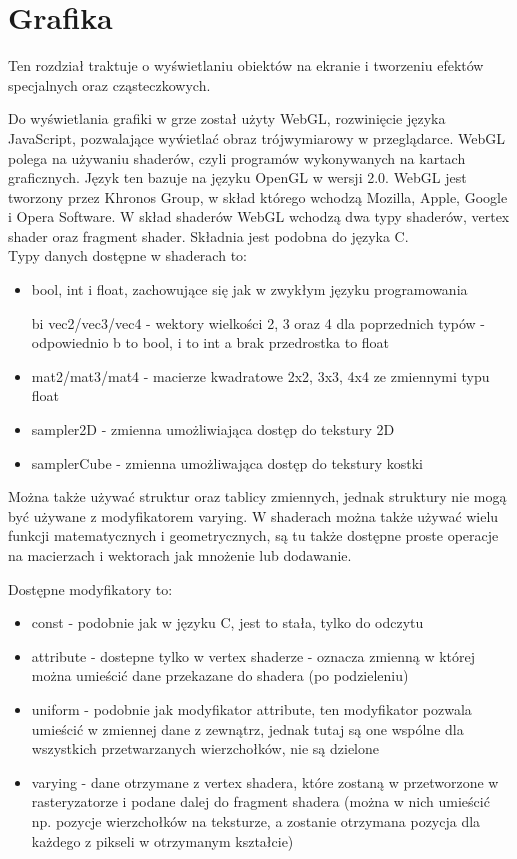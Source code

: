 \chapter{Grafika}
\thispagestyle{chapterBeginStyle}
\label{chapter_graphics}

Ten rozdział traktuje o wy\'swietlaniu obiektów na ekranie i tworzeniu efektów specjalnych oraz cząsteczkowych.

Do wy\'swietlania grafiki w grze został użyty WebGL, rozwinięcie języka JavaScript, pozwalające wy\'wietlać obraz trójwymiarowy w przeglądarce. WebGL polega na używaniu shaderów, czyli programów wykonywanych na kartach graficznych. Język ten bazuje na języku OpenGL w wersji 2.0. WebGL jest tworzony przez Khronos Group, w skład którego wchodzą Mozilla, Apple, Google i Opera Software. W skład shaderów WebGL wchodzą dwa typy shaderów, vertex shader oraz fragment shader. Składnia jest podobna do języka C.\\
Typy danych dostępne w shaderach to:\begin{itemize}[topsep=0.2em, itemsep=0.5em, partopsep=0em, parsep=0em]
	\item bool, int i float, zachowujące się jak w zwykłym języku programowania
	\item [bi]vec2/vec3/vec4 - wektory wielko\'sci 2, 3 oraz 4 dla poprzednich typów - odpowiednio b to bool, i to int a brak przedrostka to float
	\item mat2/mat3/mat4 - macierze kwadratowe 2x2, 3x3, 4x4 ze zmiennymi typu float
	\item sampler2D - zmienna umożliwiająca dostęp do tekstury 2D
	\item samplerCube - zmienna umożliwająca dostęp do tekstury kostki
\end{itemize}
Można także używać struktur oraz tablicy zmiennych, jednak struktury nie mogą być używane z modyfikatorem varying. W shaderach można także używać wielu funkcji matematycznych i geometrycznych, są tu także dostępne proste operacje na macierzach i wektorach jak mnożenie lub dodawanie.

Dostępne modyfikatory to:\begin{itemize}[topsep=0.2em, itemsep=0.5em, partopsep=0em, parsep=0em]
	\item const - podobnie jak w języku C, jest to stała, tylko do odczytu
	\item attribute - dostepne tylko w vertex shaderze - oznacza zmienną w której można umie\'scić dane przekazane do shadera (po podzieleniu)
	\item uniform - podobnie jak modyfikator attribute, ten modyfikator pozwala umie\'scić w zmiennej dane z zewnątrz, jednak tutaj są one wspólne dla wszystkich przetwarzanych wierzchołków, nie są dzielone
	\item varying - dane otrzymane z vertex shadera, które zostaną w przetworzone w rasteryzatorze i podane dalej do fragment shadera (można w nich umie\'scić np. pozycje wierzchołków na teksturze, a zostanie otrzymana pozycja dla każdego z pikseli w otrzymanym kształcie)
\end{itemize}

